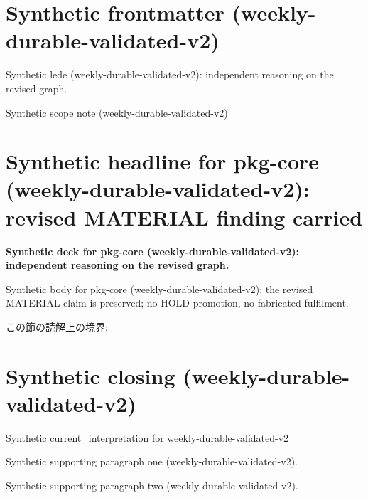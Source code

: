 \documentclass[lualatex,a4paper,10pt]{jlreq}
\begin{document}
\surveycover
\clearpage
\section*{Synthetic frontmatter (weekly-durable-validated-v2)}
Synthetic lede (weekly-durable-validated-v2): independent reasoning on the revised graph.

\begin{claimboundary}
\noindent Synthetic scope note (weekly-durable-validated-v2)\par
\end{claimboundary}
\clearpage
\twocolumn
\section{Synthetic headline for pkg-core (weekly-durable-validated-v2): revised MATERIAL finding carried}
\label{pkg:pkg-core}
\noindent\textbf{Synthetic deck for pkg-core (weekly-durable-validated-v2): independent reasoning on the revised graph.} \cite{w2026-W33target-source}\par\medskip
\noindent Synthetic body for pkg-core (weekly-durable-validated-v2): the revised MATERIAL claim is preserved; no HOLD promotion, no fabricated fulfilment.\par\medskip
\begin{claimboundary}
この節の読解上の境界: 
\end{claimboundary}
\clearpage
\onecolumn
\section{Synthetic closing (weekly-durable-validated-v2)}
\label{sec:issue-summary}
\noindent Synthetic current\_interpretation for weekly-durable-validated-v2\par\medskip
\noindent Synthetic supporting paragraph one (weekly-durable-validated-v2).\par\medskip
\noindent Synthetic supporting paragraph two (weekly-durable-validated-v2).\par\medskip
\clearpage
\onecolumn
\printbibliography[title={References / Source Notes}]
\end{document}

